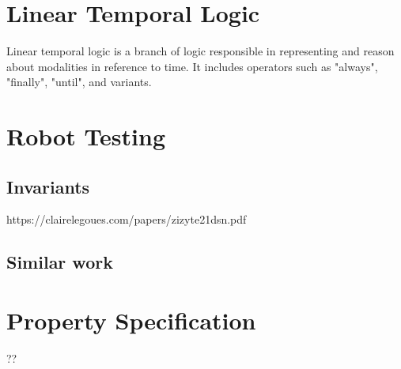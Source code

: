 \section{Linear Temporal Logic}
\label{sec:ltl}

Linear temporal logic is a branch of logic responsible in representing and reason about modalities in reference to time. It includes operators such as "always", "finally", "until", and variants.

\section{Robot Testing}
\label{sec:robottesting}

\subsection{Invariants}
https://clairelegoues.com/papers/zizyte21dsn.pdf

\subsection{Similar work}

\section{Property Specification}
\label{sec:propspecification}
??
